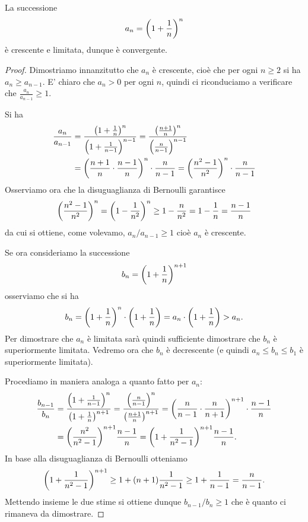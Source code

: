 \begin{theorem}
\mymark{**}
La successione
\[
  a_n = {\left( 1+\frac 1 n \right)}^n
\]
è crescente e limitata, dunque è convergente.
\end{theorem}
%
\begin{proof}
Dimostriamo innanzitutto che $a_n$ è crescente, cioè che
per ogni $n\ge 2$ si ha $a_n \ge a_{n-1}$.
E' chiaro che $a_n>0$ per ogni $n$,
quindi ci riconduciamo a
verificare che $\frac{a_n}{a_{n-1}} \ge 1$.

Si ha
\begin{align*}
\frac{a_n}{a_{n-1}}
&= \frac{{\left( 1+\frac 1 n \right)}^n}{{\left( 1+\frac 1 {n-1} \right)}^{n-1}}
= \frac{{\left( \frac{n+1}{n} \right)}^n}{{\left( \frac{n}{n-1} \right)}^{n-1}}\\
&= {\left( \frac{n+1}{n}\cdot\frac{n-1}{n} \right)}^n \cdot \frac{n}{n-1}
= {\left( \frac{n^2- 1}{n^2} \right)}^n \cdot \frac{n}{n-1}
\end{align*}
Osserviamo ora che la disuguaglianza di Bernoulli garantisce
\[
  {\left( \frac{n^2 -1}{n^2} \right)}^n
  = {\left( 1-\frac{1}{n^2} \right)}^n
  \ge 1 - \frac{n}{n^2} = 1 - \frac{1}{n} = \frac{n-1}{n}
\]
da cui si ottiene, come volevamo, $a_n / a_{n-1} \ge 1$ cioè
$a_n$ è crescente.

Se ora consideriamo la successione
\[
  b_n = {\left( 1+\frac 1 n \right)}^{n+1}
\]
osserviamo che si ha
\[
  b_n = {\left( 1+\frac 1 n \right)}^n \cdot {\left( 1+\frac 1 n \right)}
   = a_n\cdot {\left( 1+\frac 1 n \right)} > a_n.
\]
Per dimostrare che $a_n$ è limitata sarà quindi sufficiente dimostrare
che $b_n$ è superiormente limitata. Vedremo ora che $b_n$ è decrescente (e quindi $a_n \le b_n \le b_1$ è superiormente limitata).

Procediamo in maniera analoga a quanto fatto per $a_n$:
\begin{align*}
\frac{b_{n-1}}{b_n}
& = \frac{{\left( 1+\frac{1}{n-1} \right)}^n}{{\left( 1+\frac{1}{n} \right)}^{n+1}}
  = \frac{{\left( \frac{n}{n-1} \right)}^n}{{\left( \frac{n+1}{n} \right)}^{n+1}}
  = {\left( \frac{n}{n-1}\cdot\frac{n}{n+1} \right)}^{n+1}\cdot\frac{n-1}{n} \\
& = {\left( \frac{n^2}{n^2-1} \right)}^{n+1} \frac{n-1}{n}
  = {\left( 1 + \frac{1}{n^2-1} \right)}^{n+1} \frac{n-1}{n}.
\end{align*}
In base alla disuguaglianza di Bernoulli otteniamo
\[
  {\left( 1 + \frac{1}{n^2-1} \right)}^{n+1}
  \ge 1 + (n+1) \frac{1}{n^2-1}
  \ge 1 + \frac{1}{n-1} = \frac{n}{n-1}.
\]
Mettendo insieme le due stime si ottiene dunque $b_{n-1}/b_n \ge 1$
che è quanto ci rimaneva da dimostrare.
\end{proof}

